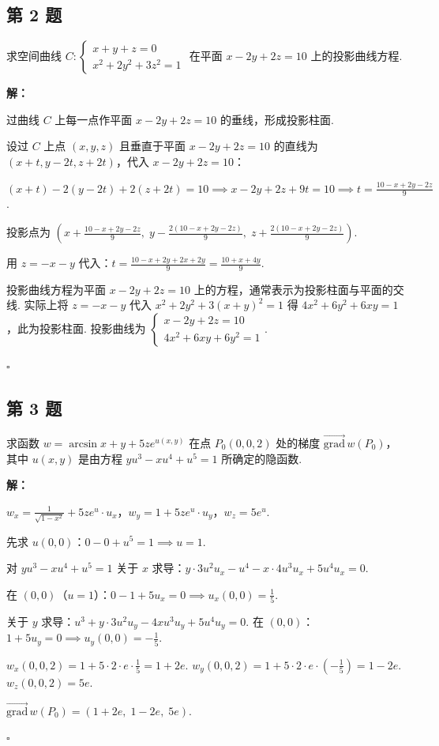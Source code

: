 \documentclass[12pt,a4paper]{article}
\newenvironment{sol}[1][解]{%
  \par\medskip\noindent\textbf{#1：}\itshape\par\noindent\ignorespaces
}{%
  \par\hfill$\square$\par\medskip
}
\begin{document}
\subsection*{第 2 题}
求空间曲线 $C:
\begin{cases}x+y+z=0 \\ x^2+2y^2+3z^2=1
\end{cases}$ 在平面 $x-2y+2z=10$ 上的投影曲线方程.

\begin{sol}过曲线 $C$ 上每一点作平面 $x-2y+2z=10$ 的垂线，形成投影柱面.

  设过 $C$ 上点 $(x,y,z)$ 且垂直于平面 $x-2y+2z=10$ 的直线为 $(x+t,y-2t,z+2t)$，代入
  $x-2y+2z=10$：

  $(x+t)-2(y-2t)+2(z+2t)=10\implies x-2y+2z+9t=10\implies
  t=\frac{10-x+2y-2z}{9}$.

  投影点为 $(x+\frac{10-x+2y-2z}{9},\; y-\frac{2(10-x+2y-2z)}{9},\;
  z+\frac{2(10-x+2y-2z)}{9})$.

  用 $z=-x-y$ 代入：$t=\frac{10-x+2y+2x+2y}{9}=\frac{10+x+4y}{9}$.

  投影曲线方程为平面 $x-2y+2z=10$ 上的方程，通常表示为投影柱面与平面的交线. 实际上将 $z=-x-y$ 代入
  $x^2+2y^2+3(x+y)^2=1$ 得 $4x^2+6y^2+6xy=1$，此为投影柱面. 投影曲线为 $
  \begin{cases}x-2y+2z=10\\4x^2+6xy+6y^2=1
  \end{cases}$.

\end{sol}
\subsection*{第 3 题}
求函数 $w=\arcsin x+y+5ze^{u(x,y)}$ 在点 $P_0(0,0,2)$ 处的梯度
$\vec{\text{grad}}\,w(P_0)$，其中 $u(x,y)$ 是由方程 $yu^3-xu^4+u^5=1$ 所确定的隐函数.

\begin{sol}$w_x=\frac{1}{\sqrt{1-x^2}}+5ze^{u}\cdot
  u_x$，$w_y=1+5ze^{u}\cdot u_y$，$w_z=5e^{u}$.

  先求 $u(0,0)$：$0-0+u^5=1\implies u=1$.

  对 $yu^3-xu^4+u^5=1$ 关于 $x$ 求导：$y\cdot 3u^2u_x-u^4-x\cdot 4u^3u_x+5u^4u_x=0$.

  在 $(0,0)$（$u=1$）：$0-1+5u_x=0\implies u_x(0,0)=\frac{1}{5}$.

  关于 $y$ 求导：$u^3+y\cdot 3u^2u_y-4xu^3u_y+5u^4u_y=0$. 在
  $(0,0)$：$1+5u_y=0\implies u_y(0,0)=-\frac{1}{5}$.

  $w_x(0,0,2)=1+5\cdot 2\cdot e\cdot\frac{1}{5}=1+2e$.
  $w_y(0,0,2)=1+5\cdot 2\cdot e\cdot(-\frac{1}{5})=1-2e$. $w_z(0,0,2)=5e$.

  $\vec{\text{grad}}\,w(P_0)=(1+2e,\; 1-2e,\; 5e).$

\end{sol}
\end{document}
